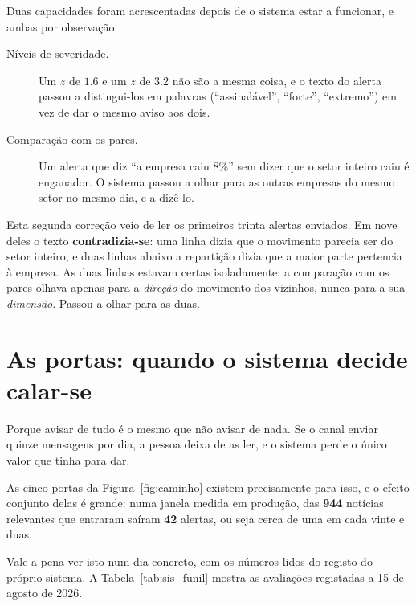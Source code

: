Duas capacidades foram acrescentadas depois de o sistema estar a funcionar, e ambas por observação:

\begin{description}
  \item[Níveis de severidade.] Um $z$ de $1.6$ e um $z$ de $3.2$ não são a mesma coisa, e o texto do
        alerta passou a distingui-los em palavras (``assinalável'', ``forte'', ``extremo'') em
        vez de dar o mesmo aviso aos dois.
  \item[Comparação com os pares.] Um alerta que diz ``a empresa caiu 8\%'' sem dizer que o setor
        inteiro caiu é enganador. O sistema passou a olhar para as outras empresas do mesmo setor no
        mesmo dia, e a dizê-lo.
\end{description}

Esta segunda correção veio de ler os primeiros trinta alertas enviados. Em nove deles o texto
\textbf{contradizia-se}: uma linha dizia que o movimento parecia ser do setor inteiro, e duas linhas
abaixo a repartição dizia que a maior parte pertencia à empresa. As duas linhas estavam certas
isoladamente: a comparação com os pares olhava apenas para a \emph{direção} do movimento dos
vizinhos, nunca para a sua \emph{dimensão}. Passou a olhar para as duas.

\section{As portas: quando o sistema decide calar-se}
\label{sec:sis_portas}

Porque avisar de tudo é o mesmo que não avisar de nada. Se o canal enviar quinze mensagens por dia,
a pessoa deixa de as ler, e o sistema perde o único valor que tinha para dar.

As cinco portas da Figura~\ref{fig:caminho} existem precisamente para isso, e o efeito conjunto
delas é grande: numa janela medida em produção, das \textbf{944} notícias relevantes que entraram
saíram \textbf{42} alertas, ou seja cerca de uma em cada vinte e duas.

Vale a pena ver isto num dia concreto, com os números lidos do registo do próprio sistema. A
Tabela~\ref{tab:sis_funil} mostra as avaliações registadas a 15 de agosto de 2026.

